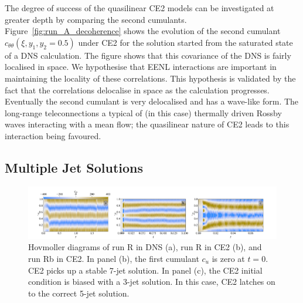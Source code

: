 \documentclass{jfm}
\newcommand{\cu}{c_u}
\newcommand{\ctt}{c_{\theta \theta}}
\begin{document}
The degree of success of the quasilinear CE2 models can be investigated at greater depth by comparing the second cumulants. Figure~\ref{fig:run_A_decoherence} shows the evolution of the second cumulant $\ctt(\xi, y_1, y_2 = 0.5)$ under CE2 for the solution started from the saturated state of a DNS calculation. The figure shows that this covariance of the DNS is fairly localised in space. We hypothesise that EENL interactions are important in maintaining the locality of these correlations. This hypothesis is validated by the fact that the correlations delocalise in space as the calculation progresses. Eventually the second cumulant is very delocalised and has a wave-like form. The long-range teleconnections a typical of (in this case) thermally driven Rossby waves interacting with a mean flow; the quasilinear nature of CE2 leads to this interaction being favoured.

\subsection{Multiple Jet Solutions}
\begin{figure}
  \centering
  \includegraphics[width=\textwidth]{../../figs/run_R_S_hov_cu_dns_ce2.pdf}
  \caption{Hovmoller diagrams of run R in DNS (a),  run R in CE2 (b), and run Rb in CE2. In panel (b), the first cumulant $\cu$ is zero at $t = 0$. CE2 picks up a stable 7-jet solution. In panel (c), the CE2 initial condition is biased with a 3-jet solution. In this case, CE2 latches on to the correct 5-jet solution.}
  \label{fig:hov_run_R}
\end{figure}
\end{document}
